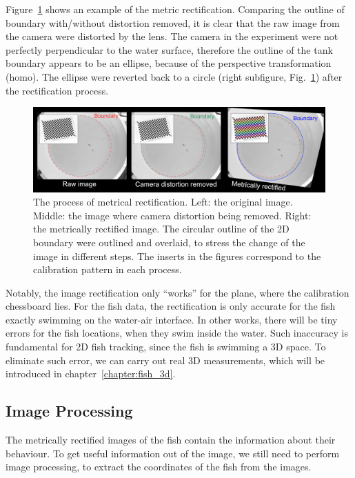 \documentclass[11pt,twoside]{report}
\begin{document}
Figure~\ref{fig:metric-rectify} shows an example of the metric rectification. Comparing the outline of boundary with/without distortion removed, it is clear that the raw image from the camera were distorted by the lens. The camera in the experiment were not perfectly perpendicular to the water surface, therefore the outline of the tank boundary appears to be an ellipse, because of the perspective transformation (\gls{homo}). The ellipse were reverted back to a circle (right subfigure, Fig.~\ref{fig:metric-rectify}) after the rectification process.

\begin{figure}
  \includegraphics[width=\linewidth]{image-calib-2d.png}
  \caption[Metrical rectification of an image.]{
  	The process of metrical rectification. Left: the original image. Middle: the image where camera distortion being removed. Right: the metrically rectified image. The circular outline of the 2D boundary were outlined and overlaid, to stress the change of the image in different steps. The inserts in the figures correspond to the calibration pattern in each process.
  }
  \label{fig:metric-rectify}
\end{figure}

Notably, the image rectification only ``works'' for the plane, where the calibration chessboard lies. For the fish data, the rectification is only accurate for the fish exactly swimming on the water-air interface. In other works, there will be tiny errors for the fish locations, when they swim inside the water. Such inaccuracy is fundamental for 2D fish tracking, since the fish is swimming a 3D space. To eliminate such error, we can carry out real 3D measurements, which will be introduced in chapter~\ref{chapter:fish_3d}.


\subsection{Image Processing}
\label{section:image_process}


The metrically rectified images of the fish contain the information about their behaviour.
To get useful information out of the image, we still need to perform image processing, to extract the coordinates of the fish from the images.
\end{document}
